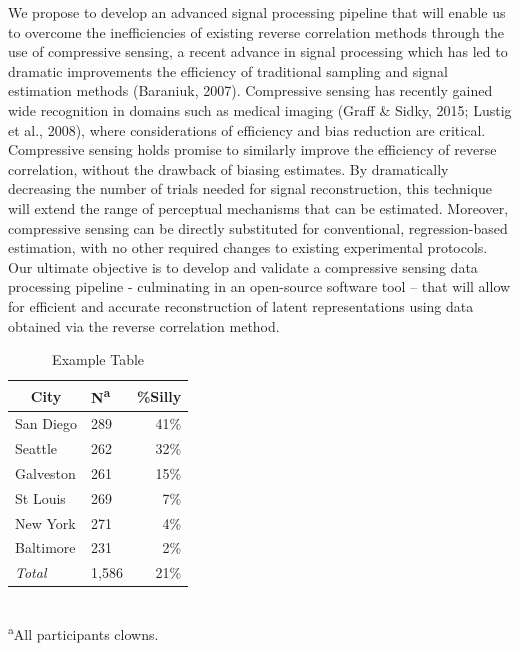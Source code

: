 \documentclass[11pt, notitlepage]{article} %
\begin{document}
We propose to develop an advanced signal processing pipeline that will enable us to overcome
the inefficiencies of existing reverse correlation methods through the use of compressive sensing, a
recent advance in signal processing which has led to dramatic improvements the efficiency of traditional
sampling and signal estimation methods (Baraniuk, 2007). Compressive sensing has recently gained
wide recognition in domains such as medical imaging (Graff \& Sidky, 2015; Lustig et al., 2008), where
considerations of efficiency and bias reduction are critical. Compressive sensing holds promise to
similarly improve the efficiency of reverse correlation, without the drawback of biasing estimates. By
dramatically decreasing the number of trials needed for signal reconstruction, this technique will extend
the range of perceptual mechanisms that can be estimated. Moreover, compressive sensing can be
directly substituted for conventional, regression-based estimation, with no other required changes to
existing experimental protocols. Our ultimate objective is to develop and validate a compressive sensing
data processing pipeline - culminating in an open-source software tool – that will allow for efficient and
accurate reconstruction of latent representations using data obtained via the reverse correlation method.


\begin{table} %
	\caption{Example Table}
	\begin{center}
		\begin{tabular}{l l r}
			\toprule
			\multicolumn{1}{c}{City} & {N\textsuperscript{a}} & {\%Silly}\\
			\midrule
			San Diego & 289 & 41\%\\
			Seattle & 262 & 32\%\\
			Galveston & 261 & 15\%\\
			St Louis & 269 & 7\%\\
			New York & 271 & 4\%\\
			Baltimore & 231 & 2\%\\
			\emph{Total} & 1,586 & 21\%\\
			\hline 
		\end{tabular}\\
		\footnotesize\textsuperscript{a}{All participants clowns.}
	\end{center}
	\label{tab:example}
\end{table}
\end{document}
